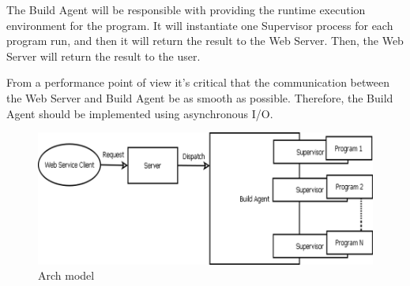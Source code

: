 The Build Agent will be responsible with providing the runtime execution environment for the program.
It will instantiate one Supervisor process for each program run, and then it will return the result to the Web Server.
Then, the Web Server will return the result to the user.

From a performance point of view it's critical that the communication between the Web Server and Build Agent be as smooth as possible.
Therefore, the Build Agent should be implemented using asynchronous I/O.

\begin{figure}
\begin{center}
\includegraphics[scale=0.3]{pics/arch.png}
\caption{Arch model}
\end{center}
\label{fig2:arch}
\end{figure}
